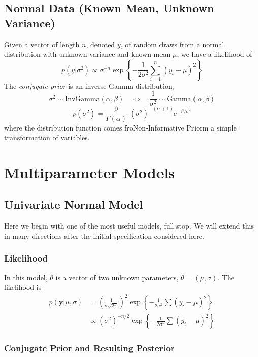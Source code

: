 \documentclass[a4paper,12pt]{scrartcl}
\begin{document}
\newpage
\subsection{Normal Data (Known Mean, Unknown Variance)}

Given a vector of length $n$, denoted $y$, of random draws from 
a normal distribution with unknown variance and known mean $\mu$, we
have a likelihood of
   \[ p(y|\sigma^2) \propto \sigma^{-n} \exp\left\{ 
      -\frac{1}{2\sigma^2} \sum^n_{i=1} (y_i - \mu)^2 \right\} \]
The \emph{conjugate prior} is an inverse Gamma distribution,
\[ \sigma^2 \sim \text{InvGamma}(\alpha, \beta) \quad
   \Leftrightarrow \quad 
   \frac{1}{\sigma^2} \sim \text{Gamma}(\alpha, \beta)
   \]
   \[ p(\sigma^2) = \frac{\beta}{\Gamma(\alpha)} \; 
      (\sigma^2)^{-(\alpha+1)} 
      e^{-\beta/\sigma^2} \]
where the distribution function comes froNon-Informative Priorm a simple 
transformation of variables.



\newpage
\section{Multiparameter Models}

\subsection{Univariate Normal Model}

Here we begin with one of the most useful models, full stop. We
will extend this in many directions after the initial specification
considered here.

\subsubsection{Likelihood}
In this model, $\theta$ is a vector of two unknown parameters,
$\theta=(\mu,\sigma)$. The likelihood is
\begin{align*}
   p(\mathbf{y}|\mu,\sigma) &= 
      \left(\frac{1}{\sigma\sqrt{2\pi}}\right)^2
      \exp\left\{ -\frac{1}{2\sigma^2} \sum (y_i-\mu)^2 \right\}\\
   &\propto (\sigma^2)^{-n/2} 
      \exp\left\{ -\frac{1}{2\sigma^2} \sum (y_i-\mu)^2 \right\}
\end{align*}

\subsubsection{Conjugate Prior and Resulting Posterior} 
\end{document}
